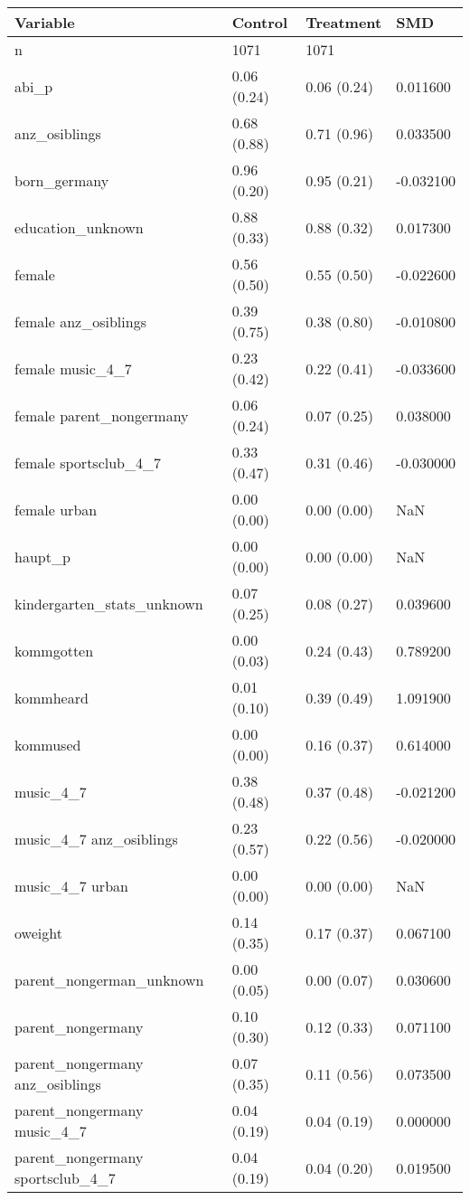 \begin{tabular}{llll}
\toprule
Variable & Control & Treatment & SMD \\
\midrule
n & 1071 & 1071 &  \\
abi\_p & 0.06 (0.24) & 0.06 (0.24) & 0.011600 \\
anz\_osiblings & 0.68 (0.88) & 0.71 (0.96) & 0.033500 \\
born\_germany & 0.96 (0.20) & 0.95 (0.21) & -0.032100 \\
education\_unknown & 0.88 (0.33) & 0.88 (0.32) & 0.017300 \\
female & 0.56 (0.50) & 0.55 (0.50) & -0.022600 \\
female anz\_osiblings & 0.39 (0.75) & 0.38 (0.80) & -0.010800 \\
female music\_4\_7 & 0.23 (0.42) & 0.22 (0.41) & -0.033600 \\
female parent\_nongermany & 0.06 (0.24) & 0.07 (0.25) & 0.038000 \\
female sportsclub\_4\_7 & 0.33 (0.47) & 0.31 (0.46) & -0.030000 \\
female urban & 0.00 (0.00) & 0.00 (0.00) & NaN \\
haupt\_p & 0.00 (0.00) & 0.00 (0.00) & NaN \\
kindergarten\_stats\_unknown & 0.07 (0.25) & 0.08 (0.27) & 0.039600 \\
kommgotten & 0.00 (0.03) & 0.24 (0.43) & 0.789200 \\
kommheard & 0.01 (0.10) & 0.39 (0.49) & 1.091900 \\
kommused & 0.00 (0.00) & 0.16 (0.37) & 0.614000 \\
music\_4\_7 & 0.38 (0.48) & 0.37 (0.48) & -0.021200 \\
music\_4\_7 anz\_osiblings & 0.23 (0.57) & 0.22 (0.56) & -0.020000 \\
music\_4\_7 urban & 0.00 (0.00) & 0.00 (0.00) & NaN \\
oweight & 0.14 (0.35) & 0.17 (0.37) & 0.067100 \\
parent\_nongerman\_unknown & 0.00 (0.05) & 0.00 (0.07) & 0.030600 \\
parent\_nongermany & 0.10 (0.30) & 0.12 (0.33) & 0.071100 \\
parent\_nongermany anz\_osiblings & 0.07 (0.35) & 0.11 (0.56) & 0.073500 \\
parent\_nongermany music\_4\_7 & 0.04 (0.19) & 0.04 (0.19) & 0.000000 \\
parent\_nongermany sportsclub\_4\_7 & 0.04 (0.19) & 0.04 (0.20) & 0.019500 \\

\end{tabular}

